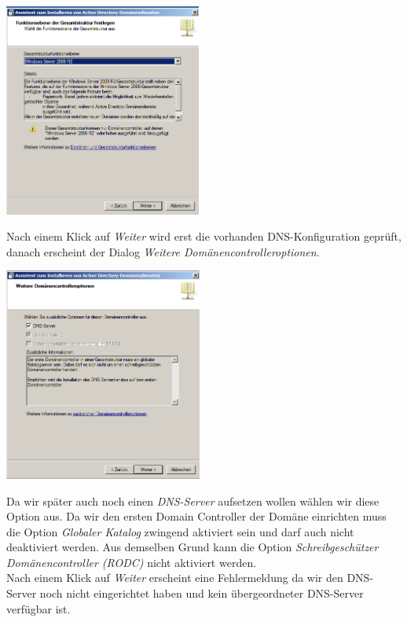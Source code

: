 \documentclass[12pt,a4paper,titlepage]{scrartcl} %
\begin{document}
	\begin{center}\includegraphics[height=7cm]{Bilder/019(dcpromo_exe06)}\\ \end{center}
	
Nach einem Klick auf \emph{Weiter} wird erst die vorhanden DNS-Konfiguration geprüft, danach erscheint der Dialog \emph{Weitere Domänencontrolleroptionen}.\\

	\begin{center}\includegraphics[height=7cm]{Bilder/021(dcpromo_exe08)}\\ \end{center}

Da wir später auch noch einen \emph{DNS-Server} aufsetzen wollen wählen wir diese Option aus. Da wir den ersten Domain Controller der Domäne einrichten muss die Option \emph{Globaler Katalog} zwingend aktiviert sein und darf auch nicht deaktiviert werden. Aus demselben Grund kann die Option \emph{Schreibgeschützer Domänencontroller (RODC)} nicht aktiviert werden.\\
Nach einem Klick auf \emph{Weiter} erscheint eine Fehlermeldung da wir den DNS-Server noch nicht eingerichtet haben und kein übergeordneter DNS-Server verfügbar ist.\\
\end{document}
